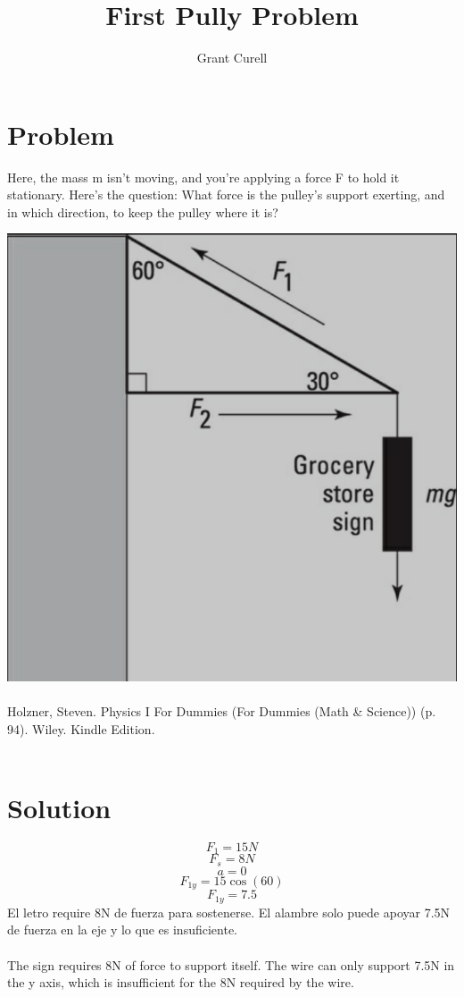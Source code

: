\documentclass{article}
\title{First Pully Problem}
\author{Grant Curell}
\begin{document}
\maketitle{}
\section{Problem}
Here, the mass m isn’t moving, and you’re applying a force F to hold it stationary. Here’s the question: What force is the pulley’s support exerting, and in which direction, to keep the pulley where it is?

\includegraphics[width=\columnwidth]{image}
\\\\
Holzner, Steven. Physics I For Dummies (For Dummies (Math \& Science)) (p. 94). Wiley. Kindle Edition.
\\\\
\section{Solution}
\[ F_1=15N \]
\[ F_s=8N \]
\[ a=0 \]
\[ F_{1y}=15\cos(60) \]
\[ F_{1y}=7.5 \]
El letro require 8N de fuerza para sostenerse. El alambre solo puede apoyar 7.5N de fuerza en la eje y lo que es insuficiente.
\\\\
The sign requires 8N of force to support itself. The wire can only support 7.5N in the y axis, which is insufficient for the 8N required by the wire.
\end{document}
